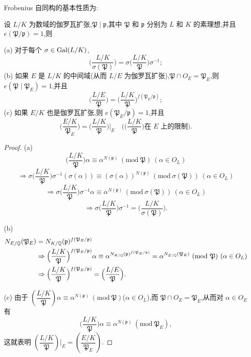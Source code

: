 Frobenius 自同构的基本性质为:

\begin{lemma}\label{lem:ch2-16}
设 $L/K$ 为数域的伽罗瓦扩张,$\mathfrak{P}\mid\mathfrak{p}$,其中 $\mathfrak{P}$ 和 $\mathfrak{p}$ 分别为 $L$ 和 $K$ 的素理想,并且 $e(\mathfrak{P}/\mathfrak{p})=1$,则

(a) 对于每个 $\sigma\in\operatorname{Gal}(L/K)$,
\[
  \Big(\frac{L/K}{\sigma(\mathfrak{P})}\Big)=\sigma\Big(\frac{L/K}{\mathfrak{P}}\Big)\sigma^{-1};
\]
(b) 如果 $E$ 是 $L/K$ 的中间域(从而 $L/E$ 为伽罗瓦扩张),$\mathfrak{P}\cap O_E=\mathfrak{P}_E$,则 $e(\mathfrak{P}\mid\mathfrak{P}_E)=1$,并且
\[
  \Big(\frac{L/E}{\mathfrak{P}}\Big)=\Big(\frac{L/K}{\mathfrak{P}}\Big)^{f(\mathfrak{P}_E/\mathfrak{p})};
\]
(c) 如果 $E/K$ 也是伽罗瓦扩张,则 $e(\mathfrak{P}_E/\mathfrak{p})=1$,并且
\[
  \Big(\frac{E/K}{\mathfrak{P}_E}\Big)=\Big(\frac{L/K}{\mathfrak{P}}\Big)\Big|_E
  \quad\Big(\Big(\frac{L/K}{\mathfrak{P}}\Big)\text{在 }E\text{ 上的限制}\Big).
\]
\end{lemma}

\begin{proof}
(a)
\[
  \Big(\frac{L/K}{\mathfrak{P}}\Big)\alpha\equiv\alpha^{N(\mathfrak{p})}\ (\mathrm{mod}\ \mathfrak{P})\ (\alpha\in O_L)
\]
\[
  \Rightarrow\sigma\Big(\frac{L/K}{\mathfrak{P}}\Big)\sigma^{-1}(\sigma(\alpha))
  \equiv(\sigma(\alpha))^{N(\mathfrak{p})}\ (\mathrm{mod}\ \sigma(\mathfrak{P}))\ (\alpha\in O_L)
\]
\[
  \Rightarrow\sigma\Big(\frac{L/K}{\mathfrak{P}}\Big)\sigma^{-1}\alpha
  \equiv\alpha^{N(\mathfrak{p})}\ (\mathrm{mod}\ \sigma(\mathfrak{P}))\ (\alpha\in O_L)
\]
\[
  \Rightarrow\sigma\Big(\frac{L/K}{\mathfrak{P}}\Big)\sigma^{-1}=\Big(\frac{L/K}{\sigma(\mathfrak{P})}\Big).
\]

(b)
\begin{align*}
  N_{E/\Q}(\mathfrak{P}_E)&=N_{K/\Q}(\mathfrak{p})^{f(\mathfrak{P}_E/\mathfrak{p})}\\
  &\Rightarrow\Big(\frac{L/K}{\mathfrak{P}}\Big)^{f(\mathfrak{P}_E/\mathfrak{p})}\alpha
  \equiv\alpha^{N_{K/\Q}(\mathfrak{p})^{f(\mathfrak{P}_E/\mathfrak{p})}}
  =\alpha^{N_{E/\Q}(\mathfrak{P}_E)}\ (\mathrm{mod}\ \mathfrak{P})\ (\alpha\in O_L)\\
  &\Rightarrow\Big(\frac{L/K}{\mathfrak{P}}\Big)^{f(\mathfrak{P}_E/\mathfrak{p})}
  =\Big(\frac{L/E}{\mathfrak{P}}\Big).
\end{align*}

(c) 由于 $\left(\dfrac{L/K}{\mathfrak{P}}\right)\alpha\equiv\alpha^{N(\mathfrak{p})}\ (\mathrm{mod}\ \mathfrak{P})$($\alpha\in O_L$),而 $\mathfrak{P}\cap O_E=\mathfrak{P}_E$,从而对 $\alpha\in O_E$ 有
\[
  \Big(\frac{L/K}{\mathfrak{P}}\Big)\alpha\equiv\alpha^{N(\mathfrak{p})}\ (\mathrm{mod}\ \mathfrak{P}_E),
\]
这就表明 $\left(\dfrac{L/K}{\mathfrak{P}}\right)\Big|_E=\left(\dfrac{E/K}{\mathfrak{P}_E}\right)$.
\end{proof}

